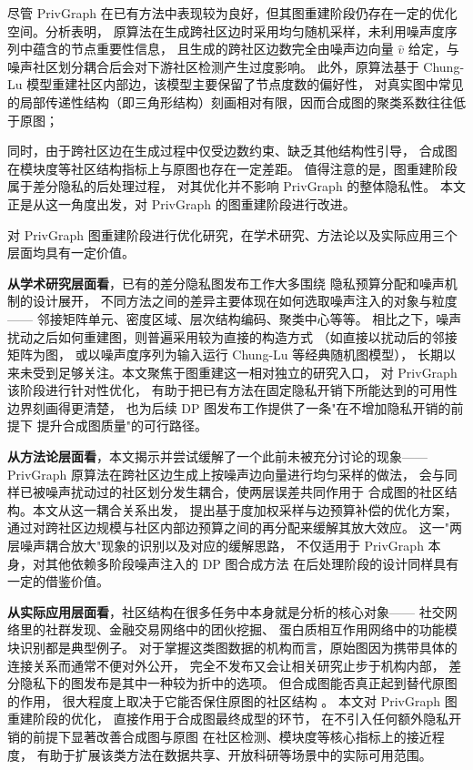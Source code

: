 \par 尽管 PrivGraph 在已有方法中表现较为良好，但其图重建阶段仍存在一定的优化空间。分析表明，
原算法在生成跨社区边时采用均匀随机采样，未利用噪声度序列中蕴含的节点重要性信息，
且生成的跨社区边数完全由噪声边向量 $\hat{v}$ 给定，与噪声社区划分耦合后会对下游社区检测产生过度影响。
此外，原算法基于 Chung-Lu 模型重建社区内部边，该模型主要保留了节点度数的偏好性，
对真实图中常见的局部传递性结构（即三角形结构）刻画相对有限，因而合成图的聚类系数往往低于原图；\par 
同时，由于跨社区边在生成过程中仅受边数约束、缺乏其他结构性引导，
合成图在模块度等社区结构指标上与原图也存在一定差距。
值得注意的是，图重建阶段属于差分隐私的后处理过程，
对其优化并不影响 PrivGraph 的整体隐私性。
本文正是从这一角度出发，对 PrivGraph 的图重建阶段进行改进。

\par 对 PrivGraph 图重建阶段进行优化研究，在学术研究、方法论以及实际应用三个层面均具有一定价值。

\par \textbf{从学术研究层面看}，已有的差分隐私图发布工作大多围绕
隐私预算分配和噪声机制的设计展开\cite{li_private_2023}，
不同方法之间的差异主要体现在如何选取噪声注入的对象与粒度——
邻接矩阵单元、密度区域、层次结构编码、聚类中心等等。
相比之下，噪声扰动之后如何重建图，则普遍采用较为直接的构造方式
（如直接以扰动后的邻接矩阵为图，
或以噪声度序列为输入运行 Chung-Lu 等经典随机图模型），
长期以来未受到足够关注。本文聚焦于图重建这一相对独立的研究入口，
对 PrivGraph 该阶段进行针对性优化，
有助于把已有方法在固定隐私开销下所能达到的可用性边界刻画得更清楚，
也为后续 DP 图发布工作提供了一条"在不增加隐私开销的前提下
提升合成图质量"的可行路径。

\par \textbf{从方法论层面看}，本文揭示并尝试缓解了一个此前未被充分讨论的现象——
PrivGraph 原算法在跨社区边生成上按噪声边向量进行均匀采样的做法，
会与同样已被噪声扰动过的社区划分发生耦合，使两层误差共同作用于
合成图的社区结构。本文从这一耦合关系出发，
提出基于度加权采样与边预算补偿的优化方案，
通过对跨社区边规模与社区内部边预算之间的再分配来缓解其放大效应。
这一"两层噪声耦合放大"现象的识别以及对应的缓解思路，
不仅适用于 PrivGraph 本身，对其他依赖多阶段噪声注入的 DP 图合成方法
在后处理阶段的设计同样具有一定的借鉴价值。

\par \textbf{从实际应用层面看}，社区结构在很多任务中本身就是分析的核心对象——
社交网络里的社群发现、金融交易网络中的团伙挖掘、
蛋白质相互作用网络中的功能模块识别都是典型例子。
对于掌握这类图数据的机构而言，原始图因为携带具体的连接关系而通常不便对外公开，
完全不发布又会让相关研究止步于机构内部，
差分隐私下的图发布是其中一种较为折中的选项。
但合成图能否真正起到替代原图的作用，
很大程度上取决于它能否保住原图的社区结构
\cite{li_private_2023}。
本文对 PrivGraph 图重建阶段的优化，
直接作用于合成图最终成型的环节，
在不引入任何额外隐私开销的前提下显著改善合成图与原图
在社区检测、模块度等核心指标上的接近程度，
有助于扩展该类方法在数据共享、开放科研等场景中的实际可用范围。

